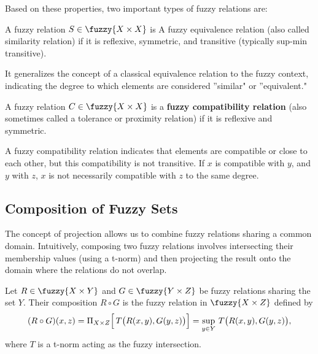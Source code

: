 Based on these properties, two important types of fuzzy relations are:

\begin{definition}
  A fuzzy relation $S \in \fuzzy{X \times X}$ is A fuzzy equivalence relation (also called similarity relation) if it is reflexive, symmetric, and transitive (typically sup-min transitive).
\end{definition}
It generalizes the concept of a classical equivalence relation to the fuzzy context, indicating the degree to which elements are considered ''similar" or ''equivalent."

\begin{definition}
  A fuzzy relation $C \in \fuzzy{X \times X}$ is a \textbf{fuzzy compatibility relation} (also sometimes called a tolerance or proximity relation) if it is reflexive and symmetric.
\end{definition}
A fuzzy compatibility relation indicates that elements are compatible or close to each other, but this compatibility is not transitive. If $x$ is compatible with $y$, and $y$ with $z$, $x$ is not necessarily compatible with $z$ to the same degree.










\subsection{Composition of Fuzzy Sets}
\label{sec:compos}

The concept of projection allows us to combine fuzzy relations sharing a common domain. Intuitively, composing two fuzzy relations involves intersecting their membership values (using a t-norm) and then projecting the result onto the domain where the relations do not overlap.

\begin{definition}\label{def:compos}
    Let \( R \in \fuzzy{X \times Y} \) and \( G \in \fuzzy{Y \times Z} \) be fuzzy relations sharing the set \(Y\). Their composition \( R \circ G \) is the fuzzy relation in \(\fuzzy{X \times Z}\) defined by
    \[
    (R \circ G)(x,z) = \Pi_{X\times Z}\Bigl[\, T\bigl(R(x,y), G(y,z)\bigr) \Bigr] = \sup_{y\in Y}\, T\bigl(R(x,y), G(y,z)\bigr),
    \]
    where \(T\) is a t-norm acting as the fuzzy intersection.
\end{definition}

